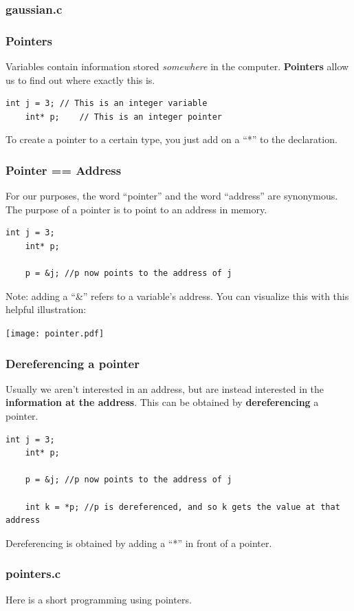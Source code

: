 \documentclass{beamer}
\begin{document}
\begin{frame}
  \frametitle{gaussian.c}
  
\end{frame}

\begin{frame}[fragile]
  \frametitle{Pointers}
  Variables contain information stored \textit{somewhere} in the computer.
  \textbf{Pointers} allow us to find out where exactly this is.
  \begin{lstlisting}[style=customc]
    int j = 3; // This is an integer variable
    int* p;    // This is an integer pointer
  \end{lstlisting}
  To create a pointer to a certain type, you just add on a ``*'' 
  to the declaration.
\end{frame}

\begin{frame}[fragile]
  \frametitle{Pointer == Address}
  For our purposes, the word ``pointer'' and the word ``address''
  are synonymous. The purpose of a pointer is to point to an address
  in memory.
  \begin{lstlisting}[style=customc]
    int j = 3;
    int* p;
    
    p = &j; //p now points to the address of j
  \end{lstlisting}
  Note: adding a ``\&'' refers to a variable's address.
  You can visualize this with this helpful illustration:
  \begin{center}
    \texttt{[image: pointer.pdf]}
  \end{center}
\end{frame}

\begin{frame}[fragile]
  \frametitle{Dereferencing a pointer}
  Usually we aren't interested in an address, but are instead interested in
  the \textbf{information at the address}. This can be obtained by
  \textbf{dereferencing} a pointer.
  \begin{lstlisting}[style=customc]
    int j = 3;
    int* p;
    
    p = &j; //p now points to the address of j

    int k = *p; //p is dereferenced, and so k gets the value at that address
  \end{lstlisting}
  Dereferencing is obtained by adding a ``*'' in front of a pointer.
\end{frame}

\begin{frame}
  \frametitle{pointers.c}
  Here is a short programming using pointers.
  
\end{frame}
\end{document}
